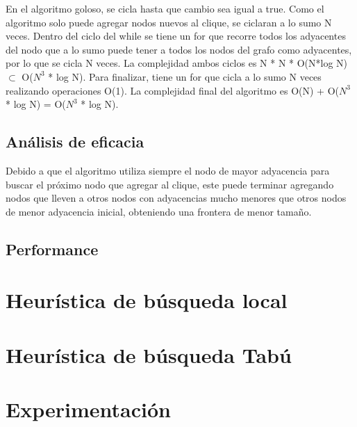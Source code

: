 \documentclass[a4paper, 10pt, twoside]{article}
\begin{document}
En el algoritmo goloso, se cicla hasta que cambio sea igual a true. Como el algoritmo solo puede agregar nodos nuevos al clique, se ciclaran a lo sumo N veces.
Dentro del ciclo del while se tiene un for que recorre todos los adyacentes del nodo que a lo sumo puede tener a todos los nodos del grafo como adyacentes, por lo que se cicla N veces.
La complejidad ambos ciclos es N * N * O(N*log N) $\subset$ O($N^3$ * log N).
Para finalizar, tiene un for que cicla a lo sumo N veces realizando operaciones O(1).
La complejidad final del algoritmo es O(N) + O($N^3$ * log N) = O($N^3$ * log N).

\subsection{Análisis de eficacia}
Debido a que el algoritmo utiliza siempre el nodo de mayor adyacencia para buscar el próximo nodo que agregar al clique, este puede terminar agregando nodos que lleven a otros nodos con adyacencias mucho menores que otros nodos de menor adyacencia inicial, obteniendo una frontera de menor tamaño.

\subsection{Performance}


\newpage

\section{Heurística de búsqueda local}




\newpage

\section{Heurística de búsqueda Tabú}




\newpage

\section{Experimentación}
\end{document}
